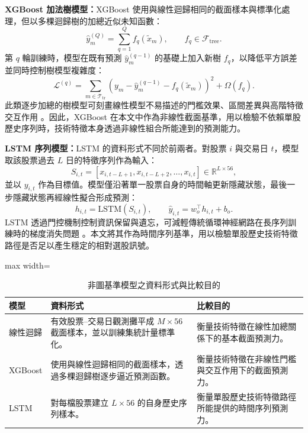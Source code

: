 \textbf{XGBoost 加法樹模型：}XGBoost 使用與線性迴歸相同的截面樣本與標準化處理，但以多棵迴歸樹的加總近似未知函數：
\begin{equation}
\widehat{y}_m^{(Q)}=\sum_{q=1}^{Q} f_q(\widetilde{x}_m), \qquad f_q\in\mathcal{F}_{\mathrm{tree}} .
\end{equation}
第 \(q\) 輪訓練時，模型在既有預測 \(\widehat{y}_m^{(q-1)}\) 的基礎上加入新樹 \(f_q\)，以降低平方誤差並同時控制樹模型複雜度：
\begin{equation}
\mathcal{L}^{(q)}
=\sum_{m\in\mathcal{T}_{\mathrm{tr}}}
\left(y_m-\widehat{y}_m^{(q-1)}-f_q(\widetilde{x}_m)\right)^2
+\Omega(f_q).
\end{equation}
此類逐步加總的樹模型可刻畫線性模型不易描述的門檻效果、區間差異與高階特徵交互作用 \cite{Chen2016XGBoost}。因此，XGBoost 在本文中作為非線性截面基準，用以檢驗不依賴單股歷史序列時，技術特徵本身透過非線性組合所能達到的預測能力。

\textbf{LSTM 序列模型：}LSTM 的資料形式不同於前兩者。對股票 \(i\) 與交易日 \(t\)，模型取該股票過去 \(L\) 日的特徵序列作為輸入：
\begin{equation}
S_{i,t}=\left[x_{i,t-L+1},x_{i,t-L+2},\ldots,x_{i,t}\right]\in\mathbb{R}^{L\times 56},
\end{equation}
並以 \(y_{i,t}\) 作為目標值。模型僅沿著單一股票自身的時間軸更新隱藏狀態，最後一步隱藏狀態再經線性擬合形成預測：
\begin{equation}
h_{i,t}=\mathrm{LSTM}(S_{i,t}), \qquad
\widehat{y}_{i,t}=w_o^{\top}h_{i,t}+b_o .
\end{equation}
LSTM 透過門控機制控制資訊保留與遺忘，可減輕傳統循環神經網路在長序列訓練時的梯度消失問題 \cite{hochreiter1997lstm}。本文將其作為時間序列基準，用以檢驗單股歷史技術特徵路徑是否足以產生穩定的相對選股訊號。

\begin{table}[H]
\centering
\caption{非圖基準模型之資料形式與比較目的}
\label{tab:baseline_model_design}
\begin{adjustbox}{max width=\textwidth}
\begin{tabular}{p{2.2cm} p{5.4cm} p{6.2cm}}
\toprule
模型 & 資料形式 & 比較目的 \\
\midrule
線性迴歸 & 有效股票--交易日觀測攤平成 \(M\times 56\) 截面樣本，並以訓練集統計量標準化。 & 衡量技術特徵在線性加總關係下的基本截面預測力。 \\
XGBoost & 使用與線性迴歸相同的截面樣本，透過多棵迴歸樹逐步逼近預測函數。 & 衡量技術特徵在非線性門檻與交互作用下的截面預測力。 \\
LSTM & 對每檔股票建立 \(L\times 56\) 的自身歷史序列樣本。 & 衡量單股歷史技術特徵路徑所能提供的時間序列預測力。 \\
\bottomrule
\end{tabular}
\end{adjustbox}
\end{table}

